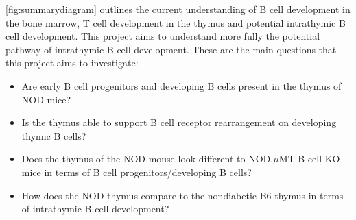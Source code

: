 \cref{fig:summarydiagram} outlines the current understanding of B cell development in the bone marrow, T cell development in the thymus and potential intrathymic B cell development.
This project aims to understand more fully the potential pathway of intrathymic B cell development.
These are the main questions that this project aims to investigate:
\begin{itemize}
\item Are early B cell progenitors and developing B cells present in the thymus of NOD mice?
\item Is the thymus able to support B cell receptor rearrangement on developing thymic B cells?
\item Does the thymus of the NOD mouse look different to NOD.$\mu$MT B cell KO mice in terms of B cell progenitors/developing B cells?
\item How does the NOD thymus compare to the nondiabetic B6 thymus in terms of intrathymic B cell development?
\end{itemize}

